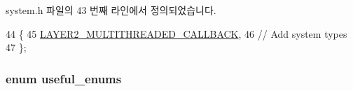 system.\+h 파일의 43 번째 라인에서 정의되었습니다.


\begin{DoxyCode}
44     \{
45         \hyperlink{classavdecc__lib_1_1system_aacdda6e9ef910c6762dd50aefd8ee5bba88df7608630d8183aa6d68acffce3680}{LAYER2\_MULTITHREADED\_CALLBACK},
46         \textcolor{comment}{// Add system types}
47     \};
\end{DoxyCode}
\subsubsection[{\texorpdfstring{useful\+\_\+enums}{useful_enums}}]{\setlength{\rightskip}{0pt plus 5cm}enum {\bf useful\+\_\+enums}\hspace{0.3cm}{\ttfamily [private]}}\hypertarget{classavdecc__lib_1_1system__layer2__multithreaded__callback_a617559bbc3d02eeb189fad2c9979ef53}{}\label{classavdecc__lib_1_1system__layer2__multithreaded__callback_a617559bbc3d02eeb189fad2c9979ef53}
